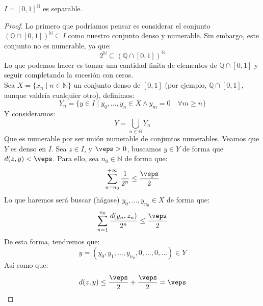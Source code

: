 \begin{lema}
    $I = {[0,1]}^{\mathbb{N}}$ es separable.
    \begin{proof}
        Lo primero que podríamos pensar es considerar el conjunto ${(\mathbb{Q}\cap [0,1])}^{\mathbb{N}} \subseteq I$ como nuestro conjunto denso y numerable. Sin embargo, este conjunto no es numerable, ya que:
        \begin{equation*}
            2^\mathbb{N} \subseteq {(\mathbb{Q}\cap [0,1])}^{\mathbb{N}}
        \end{equation*}
        Lo que podemos hacer es tomar una cantidad finita de elementos de $\mathbb{Q}\cap [0,1]$ y seguir completando la sucesión con ceros.\\

        \noindent
        Sea $X = \{x_n \mid n\in \mathbb{N}\}$ un conjunto denso de $[0,1]$ (por ejemplo, $\mathbb{Q}\cap [0,1]$, aunque valdría cualquier otro), definimos:
        \begin{equation*}
            Y_n = \{y\in I \mid y_0,\ldots,y_n \in X \land y_m = 0 \quad \forall m\geq n \}
        \end{equation*}
        Y consideramos:
        \begin{equation*}
            Y = \bigcup_{n\in \mathbb{N}} Y_n
        \end{equation*}
        Que es numerable por ser unión numerable de conjuntos numerables. Veamos que $Y$ es denso en $I$. Sea $z\in I$, y $\veps > 0$, buscamos $y\in Y$ de forma que $d(z,y)< \veps$. Para ello, sea $n_0\in \mathbb{N}$ de forma que:
        \begin{equation*}
            \sum_{n = n_0}^{+\infty}\dfrac{1}{2^n} \leq \dfrac{\veps}{2}
        \end{equation*}
        Lo que haremos será buscar (hágase) $y_0,\ldots,y_{n_0}\in X$ de forma que:
        \begin{equation*}
            \sum_{n=1}^{n_0} \dfrac{d(y_n,z_n)}{2^n} \leq \dfrac{\veps}{2}
        \end{equation*}
        De esta forma, tendremos que:
        \begin{equation*}
            y = (y_0, y_1, \ldots, y_{n_0}, 0, \ldots, 0, \ldots) \in Y
        \end{equation*}
        Así como que:
        \begin{equation*}
            d(z,y) \leq \dfrac{\veps}{2} + \dfrac{\veps}{2} = \veps
        \end{equation*}
    \end{proof}
\end{lema}

